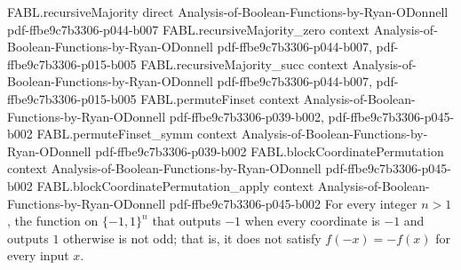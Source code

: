 \begin{theorem}
\proofstep
  {FABL.recursiveMajority}
  {direct}
  {Analysis-of-Boolean-Functions-by-Ryan-ODonnell}
  {pdf-ffbe9c7b3306-p044-b007}
\proofstep
  {FABL.recursiveMajority_zero}
  {context}
  {Analysis-of-Boolean-Functions-by-Ryan-ODonnell}
  {pdf-ffbe9c7b3306-p044-b007,
    pdf-ffbe9c7b3306-p015-b005}
\proofstep
  {FABL.recursiveMajority_succ}
  {context}
  {Analysis-of-Boolean-Functions-by-Ryan-ODonnell}
  {pdf-ffbe9c7b3306-p044-b007,
    pdf-ffbe9c7b3306-p015-b005}
\proofstep
  {FABL.permuteFinset}
  {context}
  {Analysis-of-Boolean-Functions-by-Ryan-ODonnell}
  {pdf-ffbe9c7b3306-p039-b002,
    pdf-ffbe9c7b3306-p045-b002}
\proofstep
  {FABL.permuteFinset_symm}
  {context}
  {Analysis-of-Boolean-Functions-by-Ryan-ODonnell}
  {pdf-ffbe9c7b3306-p039-b002}
\proofstep
  {FABL.blockCoordinatePermutation}
  {context}
  {Analysis-of-Boolean-Functions-by-Ryan-ODonnell}
  {pdf-ffbe9c7b3306-p045-b002}
\proofstep
  {FABL.blockCoordinatePermutation_apply}
  {context}
  {Analysis-of-Boolean-Functions-by-Ryan-ODonnell}
  {pdf-ffbe9c7b3306-p045-b002}
For every integer $n>1$, the function on $\{-1,1\}^n$ that outputs $-1$ when every
coordinate is $-1$ and outputs $1$ otherwise is not odd; that is, it does not satisfy
$f(-x)=-f(x)$ for every input $x$.
\end{theorem}

